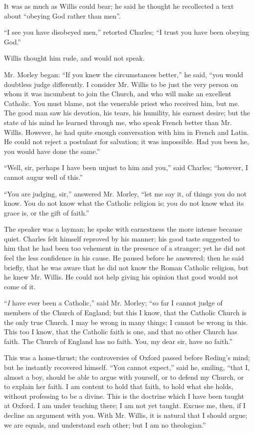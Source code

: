 It was as much as Willis could bear; he said he thought he
recollected a text about ``obeying God rather than men''.

``I see you have disobeyed men,'' retorted Charles; ``I
trust you have been obeying God.''

Willis thought him rude, and would not speak.

Mr. Morley began: ``If you knew the circumstances better,''
he said, ``you would doubtless judge differently. I consider Mr.
Willis to be just the very person on whom it was incumbent to join the
Church, and who will make an excellent Catholic. You must blame, not
the venerable priest who received him, but me. The good man saw his
devotion, his tears, his humility, his earnest desire; but the state
of his mind he learned through me, who speak French better than Mr.
Willis. However, he had quite enough conversation with him in French
and Latin. He could not reject a postulant for salvation; it was
impossible. Had you been he, you would have done the same.''

``Well, sir, perhaps I have been unjust to him and you,''
said Charles; ``however, I cannot augur well of this.''

``You are judging, sir,'' answered Mr. Morley, ``let me
say it, of things you do not know. You do not know what the Catholic
religion is; you do not know what its grace is, or the gift of
faith.''

The speaker was a layman; he spoke with earnestness the more
intense because quiet. Charles felt himself reproved by his manner;
his good taste suggested to him that he had been too vehement in the
presence of a stranger; yet he did not feel the less confidence in his
cause. He paused before he answered; then he said briefly, that he was
aware that he did not know the Roman Catholic religion, but he knew
Mr. Willis. He could not help giving his opinion that good would not
come of it.

``\emph{I} have ever been a Catholic,'' said Mr. Morley;
``so far I cannot judge of members of the Church of England; but
this I know, that the Catholic Church is the only true Church. I may
be wrong in many things; I cannot be wrong in this. This too I know,
that the Catholic faith is one, and that no other Church has faith.
The Church of England has no faith. You, my dear sir, have no
faith.''

This was a home-thrust; the controversies of Oxford passed before
Reding's mind; but he instantly recovered himself. ``You cannot
expect,'' said he, smiling, ``that I, almost a boy, should be
able to argue with yourself, or to defend my Church, or to explain her
faith. I am content to hold that faith, to hold what she holds,
without professing to be a divine. This is the doctrine which I have
been taught at Oxford. I am under teaching there; I am not yet taught.
Excuse me, then, if I decline an argument with you. With Mr. Willis,
it is natural that I should argue; we are equals, and understand each
other; but I am no theologian.''

